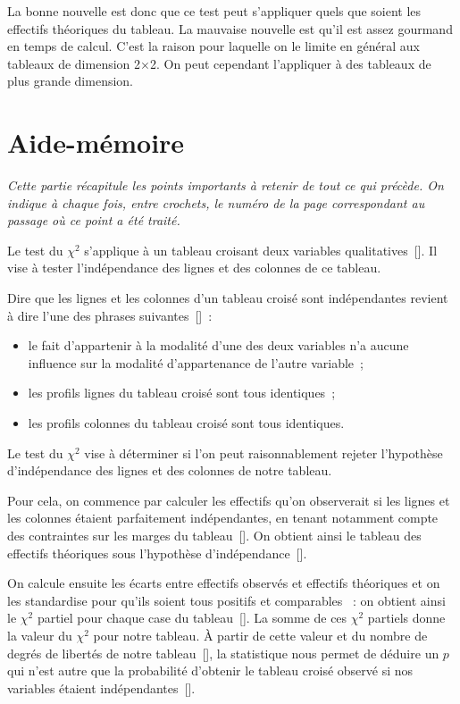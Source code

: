 \documentclass[a4paper,10pt,twoside,francais]{report}
\newcommand{\chid}{$\chi^2$\xspace}
\begin{document}
La bonne nouvelle est donc que ce test peut s'appliquer quels que
soient les effectifs théoriques du tableau. La mauvaise nouvelle est
qu'il est assez gourmand en temps de calcul. C'est la raison pour
laquelle on le limite en général aux tableaux de dimension 2$\times$2.
On peut cependant l'appliquer à des tableaux de plus grande
dimension.


\chapter{Aide-mémoire}
\label{sec-aidem}

\textit{Cette partie récapitule les points importants à retenir de
  tout ce qui précède. On indique à chaque fois, entre crochets, le
  numéro de la page correspondant au passage où ce point a été
  traité.}

Le test du \chid s'applique à un tableau croisant deux variables
qualitatives~[\pageref{ssec-tabcrois}]. Il vise à tester
l'indépendance des lignes et des colonnes de ce tableau.

Dire que les lignes et les colonnes d'un tableau croisé sont
indépendantes revient à dire l'une des phrases suivantes~[\pageref{ssec-hypindep}]~:
\begin{itemize}
\item le fait d'appartenir à la modalité d'une des deux variables n'a
  aucune influence sur la modalité d'appartenance de l'autre variable~;
\item les profils lignes du tableau croisé sont tous identiques~;
\item les profils colonnes du tableau croisé sont tous identiques.
\end{itemize}

Le test du \chid vise à déterminer si l'on peut raisonnablement
rejeter l'hypothèse d'indépendance des lignes et des colonnes de notre
tableau.

Pour cela, on commence par calculer les effectifs qu'on observerait si
les lignes et les colonnes étaient parfaitement indépendantes, en
tenant notamment compte des contraintes sur les marges du
tableau~[\pageref{ssec-contrmar}]. On obtient ainsi le tableau des
effectifs théoriques sous l'hypothèse
d'indépendance~[\pageref{ssec-calctheo}].

On calcule ensuite les écarts entre effectifs observés et effectifs
théoriques et on les \og standardise \fg{} pour qu'ils soient tous
positifs et \og comparables \fg{}~: on obtient ainsi le \chid partiel
pour chaque case du tableau~[\pageref{ssec-chidpartiels}]. La somme de
ces \chid partiels donne la valeur du \chid pour notre tableau. À
partir de cette valeur et du nombre de degrés de libertés de notre
tableau~[\pageref{ssec-ddl}], la statistique nous permet de déduire un $p$
qui n'est autre que la probabilité d'obtenir le tableau croisé observé
si nos variables étaient indépendantes~[\pageref{ssec-calcp}].
\end{document}
